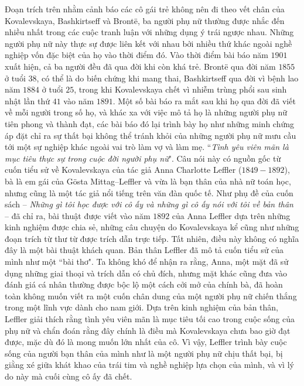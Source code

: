 \begin{multicols}{2}
	Đoạn trích trên nhằm cảnh báo các cô gái trẻ không nên đi theo vết chân của Kovalevskaya, Bashkirtseff và Brontë, ba người phụ nữ thường được nhắc đến nhiều nhất trong các cuộc tranh luận với những dụng ý trái ngược nhau.  Những người phụ nữ này thực sự được liên kết với nhau bởi nhiều thứ khác ngoài nghề nghiệp vốn đặc biệt của họ vào thời điểm đó. Vào thời điểm bài báo năm $1901$ xuất hiện, cả ba người đều đã qua đời khi còn khá trẻ. Brontë qua đời năm $1855$ ở tuổi $38$, có thể là do biến chứng khi mang thai, Bashkirtseff qua đời vì bệnh lao năm $1884$ ở tuổi $25$, trong khi Kovalevskaya chết vì nhiễm trùng phổi sau sinh nhật lần thứ $41$ vào năm $1891$. Một số bài báo ra mắt sau khi họ qua đời đã viết về mỗi người trong số họ, và khác xa với việc mô tả họ là những  người phụ nữ tiên phong và thành đạt, các bài báo đó lại trình bày họ như những minh chứng áp đặt chỉ ra sự thất bại không thể tránh khỏi của những người phụ nữ mưu cầu tới một sự nghiệp khác ngoài vai trò làm vợ và làm mẹ.
	\vskip 0.1cm
	``\textit{Tình yêu viên mãn là mục tiêu thực sự trong cuộc đời người phụ nữ}". Câu  nói này có nguồn gốc từ  cuốn tiểu sử về Kovalevskaya của tác giả Anna Charlotte Leffler ($1849-1892$), bà là em gái của Gösta Mittag--Leffler và vừa là bạn thân của nhà nữ toán học, nhưng cũng là một tác giả nổi tiếng trên văn đàn quốc tế. Như phụ đề của cuốn sách -- \textit{Những gì tôi học được với cô ấy và những gì cô ấy nói với tôi về bản thân} -- đã chỉ ra, bài thuật được viết vào năm $1892$ của Anna Leffler dựa trên những kinh nghiệm được chia sẻ, những câu chuyện do Kovalevskaya kể cũng như những đoạn trích từ thư từ được trích dẫn trực tiếp. Tất nhiên, điều này không có nghĩa đây là một bài thuật khách quan. Bản thân Leffler đã mô tả cuốn tiểu sử của mình như một ``bài thơ". Ta không khó để nhận ra rằng, Anna, một mặt đã sử dụng những giai thoại và trích dẫn có chủ đích, nhưng mặt khác cũng đưa vào đánh giá cá nhân thường được bộc lộ một cách cởi mở của chính bà, đã hoàn toàn không muốn viết ra một cuốn chân dung của một người phụ nữ chiến thắng trong một lĩnh vực dành cho nam giới. Dựa trên kinh nghiệm của bản thân, Leffler giải thích rằng tình yêu viên mãn là mục tiêu tối cao trong cuộc sống của phụ nữ và chẩn đoán rằng đây chính là điều mà Kovalevskaya chưa bao giờ đạt được, mặc dù đó là mong muốn lớn nhất của cô. Vì vậy, Leffler trình bày cuộc sống của người bạn thân của mình như là một người phụ nữ chịu thất bại, bị giằng xé giữa khát khao của trái tim và nghề nghiệp lựa chọn của mình, và vì lý do này mà cuối cùng cô ấy đã chết.
	\vskip 0.1cm

\end{multicols}
